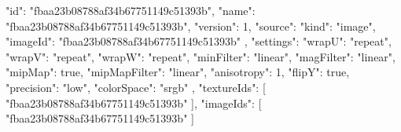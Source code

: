 {
  "id": "fbaa23b08788af34b67751149c51393b",
  "name": "fbaa23b08788af34b67751149c51393b",
  "version": 1,
  "source": {
    "kind": "image",
    "imageId": "fbaa23b08788af34b67751149c51393b"
  },
  "settings": {
    "wrapU": "repeat",
    "wrapV": "repeat",
    "wrapW": "repeat",
    "minFilter": "linear",
    "magFilter": "linear",
    "mipMap": true,
    "mipMapFilter": "linear",
    "anisotropy": 1,
    "flipY": true,
    "precision": "low",
    "colorSpace": "srgb"
  },
  "textureIds": [
    "fbaa23b08788af34b67751149c51393b"
  ],
  "imageIds": [
    "fbaa23b08788af34b67751149c51393b"
  ]
}
